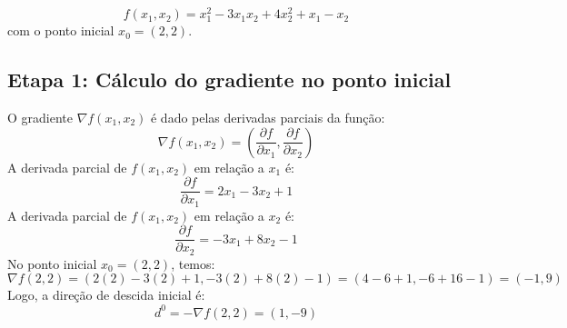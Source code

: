 \documentclass[a4paper, 12pt]{article}
\begin{document}
\[
f(x_1, x_2) = x_1^2 - 3x_1x_2 + 4x_2^2 + x_1 - x_2
\]
com o ponto inicial \( x_0 = (2, 2) \).

\subsection{Etapa 1: Cálculo do gradiente no ponto inicial}
O gradiente \( \nabla f(x_1, x_2) \) é dado pelas derivadas parciais da função:
\[
\nabla f(x_1, x_2) = \left( \frac{\partial f}{\partial x_1}, \frac{\partial f}{\partial x_2} \right)
\]
A derivada parcial de \( f(x_1, x_2) \) em relação a \( x_1 \) é:
\[
\frac{\partial f}{\partial x_1} = 2x_1 - 3x_2 + 1
\]
A derivada parcial de \( f(x_1, x_2) \) em relação a \( x_2 \) é:
\[
\frac{\partial f}{\partial x_2} = -3x_1 + 8x_2 - 1
\]
No ponto inicial \( x_0 = (2, 2) \), temos:
\[
\nabla f(2, 2) = (2(2) - 3(2) + 1, -3(2) + 8(2) - 1) = (4 - 6 + 1, -6 + 16 - 1) = (-1, 9)
\]
Logo, a direção de descida inicial é:
\[
d^0 = -\nabla f(2, 2) = (1, -9)
\]
\end{document}
